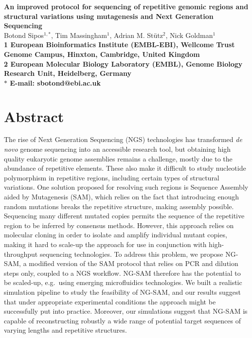 \documentclass[10pt]{article}
\date{}
\newcommand{\blue}[1]{{\color{blue} #1}}
\begin{document}
\begin{flushleft}
{\Large
\textbf{An improved protocol for sequencing of repetitive genomic regions and structural variations using mutagenesis and Next Generation Sequencing}
}
\\
Botond Sipos$^{1, \ast}$, 
Tim Massingham$^{1}$, 
Adrian M. St\"utz$^{2}$, 
Nick Goldman$^{1}$
\\
\bf{1} European Bioinformatics Institute (EMBL-EBI), Wellcome Trust Genome Campus, Hinxton, Cambridge, United Kingdom
\\
\bf{2} European Molecular Biology Laboratory (EMBL), Genome Biology Research Unit, Heidelberg, Germany 
\\
$\ast$ E-mail: sbotond@ebi.ac.uk
\end{flushleft}

\section*{Abstract}

The rise of Next Generation Sequencing (NGS) technologies has transformed {\it de novo} genome sequencing into an accessible research tool, but obtaining high quality eukaryotic genome assemblies remains a challenge, mostly due to the abundance of repetitive elements. These also make it difficult to study nucleotide polymorphism in repetitive regions, including certain types of structural variations. One solution proposed for resolving such regions is Sequence Assembly aided by Mutagenesis (SAM), which relies on the fact that introducing enough random mutations breaks the repetitive structure, making assembly possible. Sequencing many different mutated copies permits the sequence of the repetitive region to be inferred by consensus methods. However, this approach relies on molecular cloning in order to isolate and amplify individual mutant copies, making it hard to scale-up the approach \blue{for use in} conjunction with high-throughput sequencing technologies. To address this problem, we propose NG-SAM, a modified version of the SAM protocol that relies on PCR and dilution steps only, coupled to a NGS workflow. NG-SAM therefore has the potential to be scaled-up, e.g.~using emerging microfluidics technologies. We built a realistic simulation pipeline to study the feasibility of NG-SAM, and our results suggest that under appropriate experimental conditions the approach might be successfully put into practice. Moreover, our simulations suggest that NG-SAM is capable of reconstructing robustly a wide range of potential target sequences of varying lengths and repetitive structures.
\end{document}
